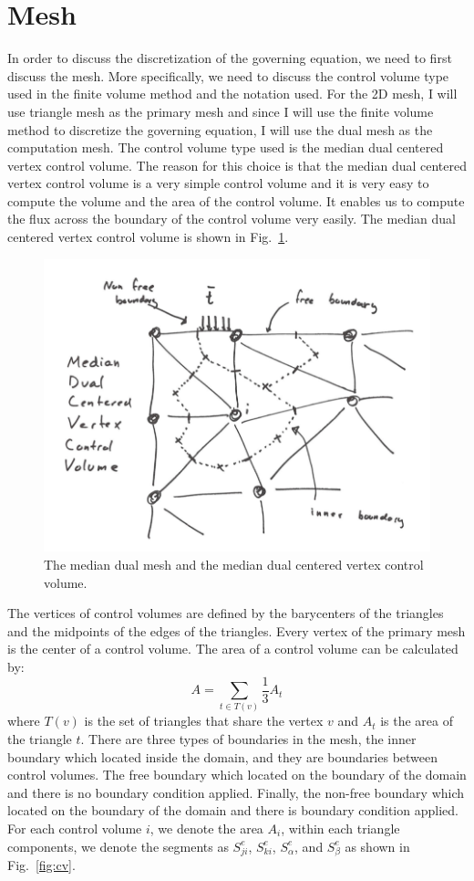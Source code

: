 \documentclass[acmtog]{acmart}
\begin{document}
\section{Mesh}
In order to discuss the discretization of the governing equation, we need to first discuss the mesh. More specifically, we need to discuss the control volume type used in the finite volume method and the notation used. For the 2D mesh, I will use triangle mesh as the primary mesh and since I will use the finite volume method to discretize the governing equation, I will use the dual mesh as the computation mesh. The control volume type used is the median dual centered vertex control volume. The reason for this choice is that the median dual centered vertex control volume is a very simple control volume and it is very easy to compute the volume and the area of the control volume. It enables us to compute the flux across the boundary of the control volume very easily. The median dual centered vertex control volume is shown in Fig.~\ref{fig:mesh}.
\begin{figure}[H]
  \centering
  \includegraphics[width=0.9\linewidth]{images/mesh.png}
  \caption{The median dual mesh and the median dual centered vertex control volume.}
  \label{fig:mesh}
\end{figure}
The vertices of control volumes are defined by the barycenters of the triangles and the midpoints of the edges of the triangles. Every vertex of the primary mesh is the center of a control volume. The area of a control volume can be calculated by:
\begin{equation*}
    A = \sum_{t \in T(v)} \frac{1}{3}A_t
\end{equation*}
where $T(v)$ is the set of triangles that share the vertex $v$ and $A_t$ is the area of the triangle $t$. There are three types of boundaries in the mesh, the inner boundary which located inside the domain, and they are boundaries between control volumes. The free boundary which located on the boundary of the domain and there is no boundary condition applied. Finally, the non-free boundary which located on the boundary of the domain and there is boundary condition applied. For each control volume $i$, we denote the area $A_i$, within each triangle components, we denote the segments as $S_{ji}^e$, $S_{ki}^e$, $S_{\alpha}^e$, and $S_{\beta}^e$ as shown in Fig.~\ref{fig:cv}. 
\end{document}
